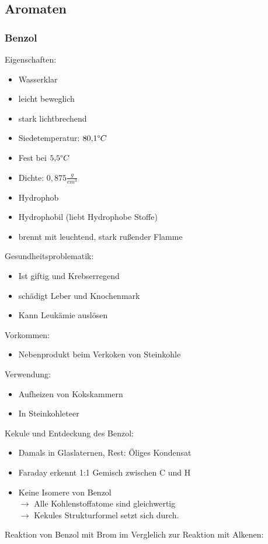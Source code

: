 \documentclass[a4paper, 12pt]{scrartcl}
\begin{document}
\subsection{Aromaten}
\subsubsection{Benzol}
Eigenschaften:
\begin{itemize}
    \item Wasserklar
    \item leicht beweglich
    \item stark lichtbrechend
    \item Siedetemperatur: $80{,}1\degree C$
    \item Fest bei $5{,}5\degree C$
    \item Dichte: $0{,}875 \frac{g}{cm^{3}}$
    \item Hydrophob
    \item Hydrophobil (liebt Hydrophobe Stoffe)
    \item brennt mit leuchtend, stark rußender Flamme
\end{itemize}
%
Gesundheitsproblematik: 
\begin{itemize}
    \item Ist giftig und Krebserregend
    \item schädigt Leber und Knochenmark
    \item Kann Leukämie auslösen
\end{itemize}
%
Vorkommen:
\begin{itemize}
    \item Nebenprodukt beim Verkoken von Steinkohle
\end{itemize}
%
Verwendung:
\begin{itemize}
    \item Aufheizen von Kokskammern
    \item In Steinkohleteer
\end{itemize}
%
Kekule und Entdeckung des Benzol:
\begin{itemize}
    \item Damals in Glaslaternen, Rest: Öliges Kondensat
    \item Faraday erkennt 1:1 Gemisch zwischen C und H
    \item Keine Isomere von Benzol\\
        $ \rightarrow$ Alle Kohlenstoffatome sind gleichwertig\\
        $ \rightarrow$ Kekules Strukturformel setzt sich durch.
\end{itemize}
%
Reaktion von Benzol mit Brom im Verglelich zur Reaktion mit Alkenen:
\end{document}
